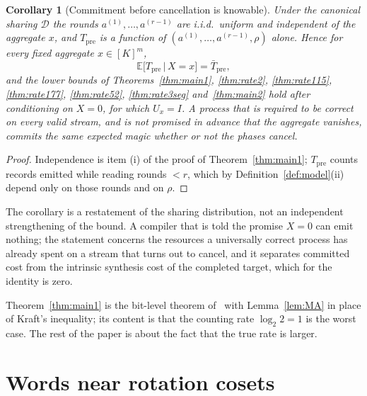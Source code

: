 \documentclass[aps,prx,twocolumn,superscriptaddress,nofootinbib,longbibliography]{revtex4-2}
\theoremstyle{plain}
\newtheorem{corollary}{Corollary}
\theoremstyle{definition}
\theoremstyle{remark}
\newcommand{\Tpre}{T_{\mathrm{pre}}}
\newcommand{\E}{\mathbb{E}}
\begin{document}
\begin{corollary}[Commitment before cancellation is knowable]\label{cor:identity}
Under the canonical sharing $\mathcal D$ the rounds $a^{(1)},\dots,a^{(r-1)}$ are i.i.d.\ uniform and independent of the aggregate $x$, and $\Tpre$ is a function of $(a^{(1)},\dots,a^{(r-1)},\rho)$ alone. Hence for every fixed aggregate $x\in[K]^m$,
\[
\E\big[\Tpre\,\big|\,X=x\big]=\bar\Tpre ,
\]
and the lower bounds of Theorems~\ref{thm:main1}, \ref{thm:rate2}, \ref{thm:rate115}, \ref{thm:rate177}, \ref{thm:rate52}, \ref{thm:rate3seg} and~\ref{thm:main2} hold after conditioning on $X=0$, for which $U_x=I$. A process that is required to be correct on every valid stream, and is not promised in advance that the aggregate vanishes, commits the same expected magic whether or not the phases cancel.
\end{corollary}
\begin{proof}
Independence is item (i) of the proof of Theorem~\ref{thm:main1}; $\Tpre$ counts records emitted while reading rounds $<r$, which by Definition~\ref{def:model}(ii) depend only on those rounds and on $\rho$.
\end{proof}
The corollary is a restatement of the sharing distribution, not an independent strengthening of the bound. A compiler that is told the promise $X=0$ can emit nothing; the statement concerns the resources a universally correct process has already spent on a stream that turns out to cancel, and it separates committed cost from the intrinsic synthesis cost of the completed target, which for the identity is zero.

Theorem~\ref{thm:main1} is the bit-level theorem of~\cite{Paper1} with Lemma~\ref{lem:MA} in place of Kraft's inequality; its content is that the counting rate $\log_2 2=1$ is the worst case. The rest of the paper is about the fact that the true rate is larger.

\section{Words near rotation cosets}\label{sec:tube}
\end{document}
